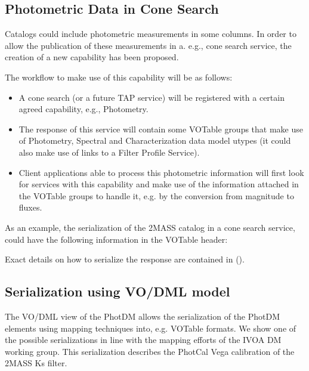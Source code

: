 \documentclass[11pt,a4paper]{ivoa}
\begin{document}
\begin{appendices}
\subsection{Photometric Data in Cone Search}
Catalogs could include photometric measurements in some columns. In order to allow the publication of these measurements in a. e.g., cone search service, the creation of a new capability has been proposed.
\par

The workflow to make use of this capability will be as follows:
\par

\begin{itemize}
	\item A cone search (or a future TAP service) will be registered with a certain agreed capability, e.g., Photometry.\par

	\item The response of this service will contain some VOTable groups that make use of Photometry, Spectral and Characterization data model utypes (it could also make use of links to a Filter Profile Service).\par

	\item Client applications able to process this photometric information will first look for services with this capability and make use of the information attached in the VOTable groups to handle it, e.g. by the conversion from magnitude to fluxes.
\end{itemize}\par

As an example, the serialization of the 2MASS catalog in a cone search service, could have the following information in the VOTable header:
\par


Exact details on how to serialize the response are contained in (\citep{derriere}).

\subsection{Serialization using VO/DML model} \label{appendixmapping}
The VO/DML view of the PhotDM allows the serialization of the PhotDM elements using mapping techniques into, e.g. VOTable formats. We show one of the possible serializations in line with the mapping efforts of the IVOA DM working group. This serialization describes the PhotCal Vega calibration of the 2MASS Ks filter.
\par 



\end{appendices}
\end{document}

